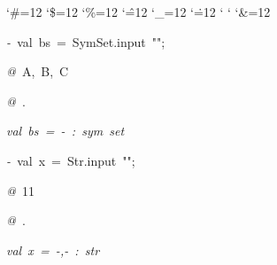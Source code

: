 \begin{list}{}
{\setlength{\leftmargin}{\leftmargini}
\setlength{\rightmargin}{0cm}
\setlength{\itemindent}{0cm}
\setlength{\listparindent}{0cm}
\setlength{\itemsep}{0cm}
\setlength{\parsep}{0cm}
\setlength{\labelsep}{0cm}
\setlength{\labelwidth}{0cm}
\catcode`\#=12
\catcode`\$=12
\catcode`\%=12
\catcode`\^=12
\catcode`\_=12
\catcode`\.=12
\catcode`
\catcode`
\catcode`\&=12
\ttfamily}
\small
\item[]\textsl{-\ }val\ bs\ =\ SymSet.input\ "";
\item[]\textsl{@\ }A,\ B,\ C
\item[]\textsl{@\ }.
\item[]\textsl{val\ bs\ =\ -\ :\ sym\ set}
\item[]\textsl{-\ }val\ x\ =\ Str.input\ "";
\item[]\textsl{@\ }11
\item[]\textsl{@\ }.
\item[]\textsl{val\ x\ =\ -,-\ :\ str}
\end{list}
